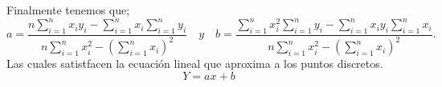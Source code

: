 \documentclass[11pt,a4paper]{article}
\begin{document}
Finalmente tenemos que; 
\[a=\frac { n\sum _{ i=1 }^{ n }{ { x }_{ i }{ y }_{ i } } -\sum _{ i=1 }^{ n }{ { x }_{ i } } \sum _{ i=1 }^{ n }{ { y }_{ i } }  }{ n\sum _{ i=1 }^{ n }{ { x }_{ i }^{ 2 } } -{ \left( \sum _{ i=1 }^{ n }{ { x }_{ i } }  \right)  }^{ 2 } } \quad y\quad b=\frac { \sum _{ i=1 }^{ n }{ { x }_{ i }^{ 2 } } \sum _{ i=1 }^{ n }{ { y }_{ i } } -\sum _{ i=1 }^{ n }{ { x }_{ i }{ y }_{ i } } \sum _{ i=1 }^{ n }{ { x }_{ i } }  }{ n\sum _{ i=1 }^{ n }{ { x }_{ i }^{ 2 } } -{ \left( \sum _{ i=1 }^{ n }{ { x }_{ i } }  \right)  }^{ 2 } }.\]
Las cuales satistfacen la ecuaci\'{o}n lineal que aproxima a los puntos discretos. 
\begin{equation}
Y= ax+b
\end{equation}
\end{document}
